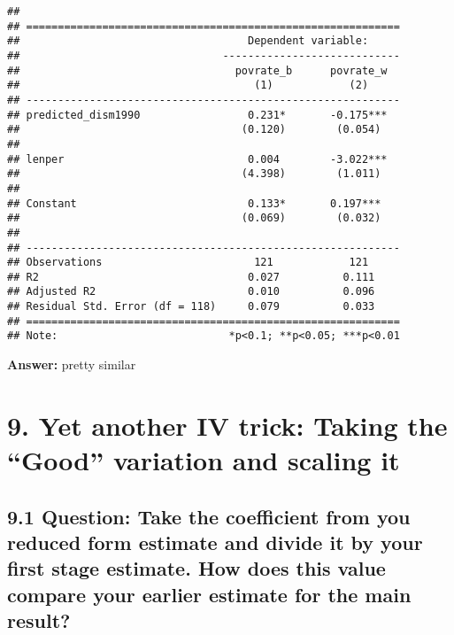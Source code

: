\documentclass[
]{article}
\begin{document}
\begin{verbatim}
## 
## ===========================================================
##                                    Dependent variable:     
##                                ----------------------------
##                                  povrate_b      povrate_w  
##                                     (1)            (2)     
## -----------------------------------------------------------
## predicted_dism1990                 0.231*       -0.175***  
##                                   (0.120)        (0.054)   
##                                                            
## lenper                             0.004        -3.022***  
##                                   (4.398)        (1.011)   
##                                                            
## Constant                           0.133*       0.197***   
##                                   (0.069)        (0.032)   
##                                                            
## -----------------------------------------------------------
## Observations                        121            121     
## R2                                 0.027          0.111    
## Adjusted R2                        0.010          0.096    
## Residual Std. Error (df = 118)     0.079          0.033    
## ===========================================================
## Note:                           *p<0.1; **p<0.05; ***p<0.01
\end{verbatim}

\textbf{Answer:} pretty similar

\clearpage

\hypertarget{yet-another-iv-trick-taking-the-good-variation-and-scaling-it}{%
\section{9. Yet another IV trick: Taking the ``Good'' variation and
scaling
it}\label{yet-another-iv-trick-taking-the-good-variation-and-scaling-it}}

\hypertarget{question-take-the-coefficient-from-you-reduced-form-estimate-and-divide-it-by-your-first-stage-estimate.-how-does-this-value-compare-your-earlier-estimate-for-the-main-result}{%
\subsection{9.1 Question: Take the coefficient from you reduced form
estimate and divide it by your first stage estimate. How does this value
compare your earlier estimate for the main
result?}\label{question-take-the-coefficient-from-you-reduced-form-estimate-and-divide-it-by-your-first-stage-estimate.-how-does-this-value-compare-your-earlier-estimate-for-the-main-result}}
\end{document}
